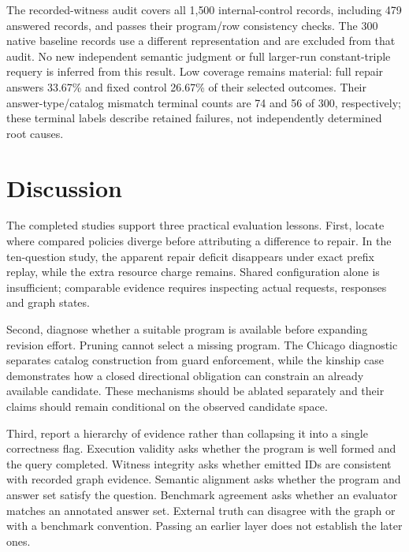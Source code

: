 \documentclass[10pt]{article}
\begin{document}
The recorded-witness audit covers all 1,500 internal-control records, including 479 answered records, and passes their program/row consistency checks. The 300 native baseline records use a different representation and are excluded from that audit. No new independent semantic judgment or full larger-run constant-triple requery is inferred from this result. Low coverage remains material: full repair answers 33.67\% and fixed control 26.67\% of their selected outcomes. Their answer-type/catalog mismatch terminal counts are 74 and 56 of 300, respectively; these terminal labels describe retained failures, not independently determined root causes.\par

\section{Discussion}

The completed studies support three practical evaluation lessons. First, locate where compared policies diverge before attributing a difference to repair. In the ten-question study, the apparent repair deficit disappears under exact prefix replay, while the extra resource charge remains. Shared configuration alone is insufficient; comparable evidence requires inspecting actual requests, responses and graph states.\par

Second, diagnose whether a suitable program is available before expanding revision effort. Pruning cannot select a missing program. The Chicago diagnostic separates catalog construction from guard enforcement, while the kinship case demonstrates how a closed directional obligation can constrain an already available candidate. These mechanisms should be ablated separately and their claims should remain conditional on the observed candidate space.\par

Third, report a hierarchy of evidence rather than collapsing it into a single correctness flag. Execution validity asks whether the program is well formed and the query completed. Witness integrity asks whether emitted IDs are consistent with recorded graph evidence. Semantic alignment asks whether the program and answer set satisfy the question. Benchmark agreement asks whether an evaluator matches an annotated answer set. External truth can disagree with the graph or with a benchmark convention. Passing an earlier layer does not establish the later ones.\par
\end{document}

